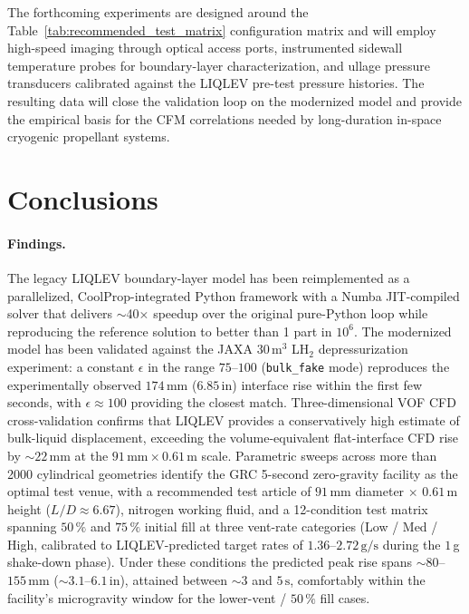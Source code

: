 \documentclass[conf]{new-aiaa}
\begin{document}

The forthcoming experiments are designed around the Table~\ref{tab:recommended_test_matrix} configuration matrix and will employ high-speed imaging through optical access ports, instrumented sidewall temperature probes for boundary-layer characterization, and ullage pressure transducers calibrated against the LIQLEV pre-test pressure histories. The resulting data will close the validation loop on the modernized model and provide the empirical basis for the CFM correlations needed by long-duration in-space cryogenic propellant systems.

\section{Conclusions}
\label{sec:conclusions}

\paragraph{Findings.} The legacy LIQLEV boundary-layer model has been reimplemented as a parallelized, CoolProp-integrated Python framework with a Numba JIT-compiled solver that delivers $\sim$40$\times$ speedup over the original pure-Python loop while reproducing the reference solution to better than 1 part in $10^6$. The modernized model has been validated against the JAXA $30\,\text{m}^3$ LH$_2$ depressurization experiment: a constant $\epsilon$ in the range $75$--$100$ (\texttt{bulk\_fake} mode) reproduces the experimentally observed $174\,\text{mm}$ ($6.85\,\text{in}$) interface rise within the first few seconds, with $\epsilon \approx 100$ providing the closest match. Three-dimensional VOF CFD cross-validation confirms that LIQLEV provides a conservatively high estimate of bulk-liquid displacement, exceeding the volume-equivalent flat-interface CFD rise by $\sim 22\,\text{mm}$ at the $91\,\text{mm} \times 0.61\,\text{m}$ scale. Parametric sweeps across more than 2000 cylindrical geometries identify the GRC 5-second zero-gravity facility as the optimal test venue, with a recommended test article of $91\,\text{mm}$ diameter $\times$ $0.61\,\text{m}$ height ($L/D \approx 6.67$), nitrogen working fluid, and a 12-condition test matrix spanning $50\,\%$ and $75\,\%$ initial fill at three vent-rate categories (Low / Med / High, calibrated to LIQLEV-predicted target rates of $1.36$--$2.72\,\text{g/s}$ during the $1\,$g shake-down phase). Under these conditions the predicted peak rise spans $\sim 80$--$155\,\text{mm}$ ($\sim 3.1$--$6.1\,\text{in}$), attained between $\sim 3$ and $5\,\text{s}$, comfortably within the facility's microgravity window for the lower-vent / $50\,\%$ fill cases.
\end{document}
